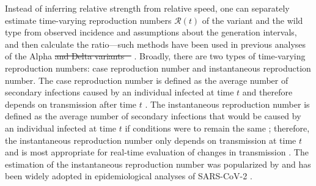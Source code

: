\documentclass[12pt]{article}
\newcommand{\RR}{\ensuremath{{\mathcal R}}\xspace}
\providecommand{\DIFaddtex}[1]{{\protect\color{blue}\uwave{#1}}} %
\providecommand{\DIFdeltex}[1]{{\protect\color{red}\sout{#1}}}                      %
\providecommand{\DIFaddbegin}{} %
\providecommand{\DIFaddend}{} %
\providecommand{\DIFdelbegin}{} %
\providecommand{\DIFdelend}{} %
\providecommand{\DIFadd}[1]{\texorpdfstring{\DIFaddtex{#1}}{#1}} %
\providecommand{\DIFdel}[1]{\texorpdfstring{\DIFdeltex{#1}}{}} %
\newcommand{\DIFscaledelfig}{0.5}
\newlength{\DIFdelgraphicswidth} %
\newlength{\DIFdelgraphicsheight} %
\newcommand{\DIFaddincludegraphics}[2][]{{\color{blue}\fbox{\DIFOincludegraphics[#1]{#2}}}} %
\newcommand{\DIFdelincludegraphics}[2][]{%
\sbox{\DIFdelgraphicsbox}{\DIFOincludegraphics[#1]{#2}}%
\settoboxwidth{\DIFdelgraphicswidth}{\DIFdelgraphicsbox} %
\settoboxtotalheight{\DIFdelgraphicsheight}{\DIFdelgraphicsbox} %
\scalebox{\DIFscaledelfig}{%
\parbox[b]{\DIFdelgraphicswidth}{\usebox{\DIFdelgraphicsbox}\\[-\baselineskip] \rule{\DIFdelgraphicswidth}{0em}}\llap{\resizebox{\DIFdelgraphicswidth}{\DIFdelgraphicsheight}{%
\setlength{\unitlength}{\DIFdelgraphicswidth}%
\begin{picture}(1,1)%
\thicklines\linethickness{2pt} %
{\color[rgb]{1,0,0}\put(0,0){\framebox(1,1){}}}%
{\color[rgb]{1,0,0}\put(0,0){\line( 1,1){1}}}%
{\color[rgb]{1,0,0}\put(0,1){\line(1,-1){1}}}%
\end{picture}%
}\hspace*{3pt}}} %
} %
\DeclareRobustCommand{\DIFaddbegin}{\DIFOaddbegin \let\includegraphics\DIFaddincludegraphics} %
\DeclareRobustCommand{\DIFaddend}{\DIFOaddend \let\includegraphics\DIFOincludegraphics} %
\DeclareRobustCommand{\DIFdelbegin}{\DIFOdelbegin \let\includegraphics\DIFdelincludegraphics} %
\DeclareRobustCommand{\DIFdelend}{\DIFOaddend \let\includegraphics\DIFOincludegraphics} %
\begin{document}
Instead of inferring relative strength from relative speed, one can separately estimate time-varying reproduction numbers $\RR(t)$ of the variant and the wild type from observed incidence and assumptions about the generation intervals, and then calculate the ratio---such methods have been used in previous analyses of the Alpha \citep{volz2021transmission}\DIFdelbegin \DIFdel{and Delta variants \mbox{%
\citep{abbott2021estimating}}\hspace{0pt}%
}\DIFdelend \DIFaddbegin \DIFadd{, Delta \mbox{%
\citep{abbott2021estimating}}\hspace{0pt}%
, and Omicron variants \mbox{%
\citep{pearson2021bounding}}\hspace{0pt}%
}\DIFaddend .
Broadly, there are two types of time-varying reproduction numbers: case reproduction number and instantaneous reproduction number.
The case reproduction number is defined as the average number of secondary infections caused by an individual infected at time $t$ and therefore depends on transmission after time $t$ \citep{wallinga2004different}.
The instantaneous reproduction number is defined as the average number of secondary infections that would be caused by an individual infected at time $t$ if conditions were to remain the same \citep{fraser2007estimating}; 
therefore, the instantaneous reproduction number only depends on transmission at time $t$ and is most appropriate for real-time evaluation of changes in transmission \citep{gostic2020practical}.
The estimation of the instantaneous reproduction number was popularized by \cite{cori2013new} and has been widely adopted in epidemiological analyses of SARS-CoV-2 \citep{abbott2020estimating,knight2020estimating,flaxman2020Rt,brauner2021inferring,li2021temporal}.
\end{document}
